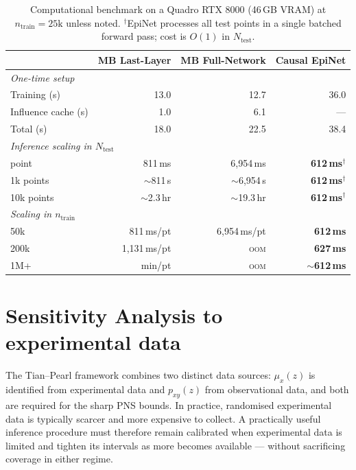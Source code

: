 \documentclass[accepted]{uai2026} %
\theoremstyle{plain}
\theoremstyle{definition}
\theoremstyle{remark}
\begin{document}
\begin{table}[h]
\centering
\caption{Computational benchmark on a Quadro RTX 8000 (46\,GB VRAM) at
$n_\mathrm{train} = 25\mathrm{k}$ unless noted.
$^\dagger$EpiNet processes all test points in a single batched forward pass;
cost is $O(1)$ in $N_\mathrm{test}$.}
\label{tab:compute}
\small
\begin{tabular}{lrrr}
\toprule
& MB Last-Layer & MB Full-Network & Causal EpiNet \\
\midrule
\multicolumn{4}{l}{\textit{One-time setup}} \\
\quad Training (s)          & 13.0   & 12.7          & 36.0  \\
\quad Influence cache (s)   & 1.0    & 6.1           & —     \\
\quad Total (s)             & 18.0   & 22.5          & 38.4  \\
\midrule
\multicolumn{4}{l}{\textit{Inference scaling in $N_\mathrm{test}$}} \\
\quad 1 point               & 811\,ms       & 6{,}954\,ms        & \textbf{612\,ms}$^\dagger$ \\
\quad 1k points             & $\sim$811\,s  & $\sim$6{,}954\,s   & \textbf{612\,ms}$^\dagger$ \\
\quad 10k points            & $\sim$2.3\,hr & $\sim$19.3\,hr     & \textbf{612\,ms}$^\dagger$ \\
\midrule
\multicolumn{4}{l}{\textit{Scaling in $n_\mathrm{train}$}} \\
\quad 50k                   & 811\,ms/pt    & 6{,}954\,ms/pt     & \textbf{612\,ms} \\
\quad 200k                  & 1{,}131\,ms/pt & \textsc{oom}      & \textbf{627\,ms} \\
\quad 1M+                   & min/pt        & \textsc{oom}       & \textbf{$\sim$612\,ms} \\
\bottomrule
\end{tabular}
\end{table}


\section{Sensitivity Analysis to experimental data} \label{app:sensitivity}

The Tian–Pearl framework combines two distinct data sources: $\mu_x(z)$ is identified
from experimental data and $p_{xy}(z)$ from observational data, and both are required
for the sharp PNS bounds. In practice, randomised experimental data is typically
scarcer and more expensive to collect. A practically useful inference procedure must
therefore remain calibrated when experimental data is limited and tighten its
intervals as more becomes available — without sacrificing coverage in either regime.
\end{document}
